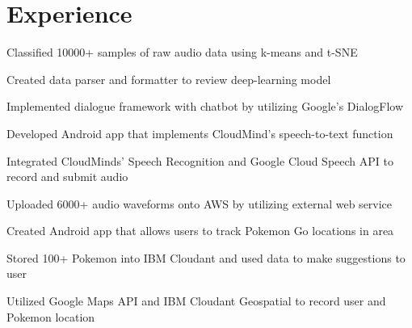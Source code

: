\documentclass[]{deedy-resume-openfont}
\begin{document}
\begin{minipage}[t]{0.66\textwidth} 


\section{Experience}

\sectionsep
\begin{tightemize} 
\item Classified 10000+ samples of raw audio data using k-means and t-SNE
\item Created data parser and formatter to review deep-learning model
\item Implemented dialogue framework with chatbot by utilizing Google's DialogFlow
\end{tightemize}
\sectionsep

\begin{tightemize} 
\item Developed Android app that implements CloudMind's speech-to-text function
\item Integrated CloudMinds’ Speech Recognition and Google Cloud Speech API to record and submit audio
\item Uploaded 6000+ audio waveforms onto AWS by utilizing external web service 
\end{tightemize}
\sectionsep

\begin{tightemize} 
\item Created Android app that allows users to track Pokemon Go locations in area 
\item Stored 100+ Pokemon into IBM Cloudant and used data to make suggestions to user
\item  Utilized Google Maps API and IBM Cloudant Geospatial to record user and Pokemon location
\end{tightemize}
\sectionsep


\end{minipage}
\end{document}
